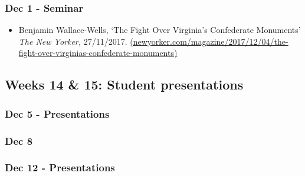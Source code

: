 \documentclass[12pt, a4paper]{article}
\begin{document}
\subsubsection*{Dec 1 - Seminar}

\begin{itemize}
\setlength\itemsep{0pt}
\item Benjamin Wallace-Wells, `The Fight Over Virginia’s Confederate Monuments' \textit{The New Yorker,} 27/11/2017. \href{https://www.newyorker.com/magazine/2017/12/04/the-fight-over-virginias-confederate-monuments}{(newyorker.com/magazine/2017/12/04/the-fight-over-virginias-confederate-monuments)}
\end{itemize}



\hline %

\subsection*{Weeks 14 \& 15: Student presentations}

\subsubsection*{Dec 5 - Presentations}

\subsubsection*{Dec 8 {}}

\subsubsection*{Dec 12 - Presentations}
\end{document}
